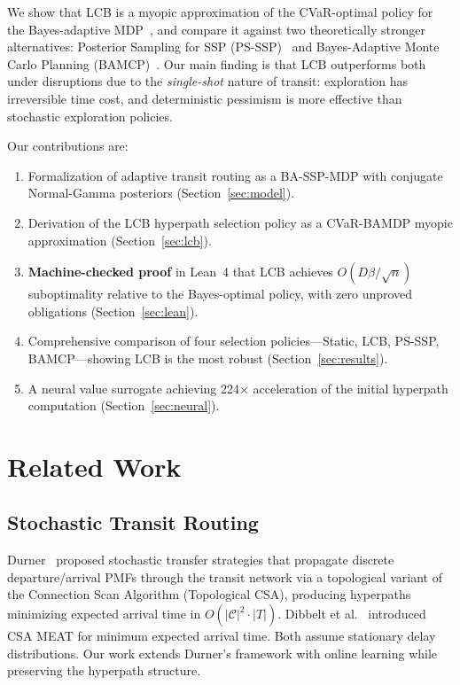 \documentclass[journal]{IEEEtran}
\begin{document}
We show that LCB is a myopic approximation of the CVaR-optimal policy for the Bayes-adaptive MDP~\cite{rigter2021}, and compare it against two theoretically stronger alternatives: Posterior Sampling for SSP (PS-SSP)~\cite{osband2017} and Bayes-Adaptive Monte Carlo Planning (BAMCP)~\cite{guez2012}. Our main finding is that LCB outperforms both under disruptions due to the \emph{single-shot} nature of transit: exploration has irreversible time cost, and deterministic pessimism is more effective than stochastic exploration policies.

Our contributions are:
\begin{enumerate}
\item Formalization of adaptive transit routing as a BA-SSP-MDP with conjugate Normal-Gamma posteriors (Section~\ref{sec:model}).
\item Derivation of the LCB hyperpath selection policy as a CVaR-BAMDP myopic approximation (Section~\ref{sec:lcb}).
\item \textbf{Machine-checked proof} in Lean~4 that LCB achieves $O(D\beta/\sqrt{n})$ suboptimality relative to the Bayes-optimal policy, with zero unproved obligations (Section~\ref{sec:lean}).
\item Comprehensive comparison of four selection policies---Static, LCB, PS-SSP, BAMCP---showing LCB is the most robust (Section~\ref{sec:results}).
\item A neural value surrogate achieving 224$\times$ acceleration of the initial hyperpath computation (Section~\ref{sec:neural}).
\end{enumerate}

\section{Related Work}
\label{sec:related}

\subsection{Stochastic Transit Routing}

Durner~\cite{durner2024} proposed stochastic transfer strategies that propagate discrete departure/arrival PMFs through the transit network via a topological variant of the Connection Scan Algorithm (Topological CSA), producing hyperpaths minimizing expected arrival time in $O(|\mathcal{C}|^2 \cdot |T|)$. Dibbelt et al.~\cite{dibbelt2013} introduced CSA MEAT for minimum expected arrival time. Both assume stationary delay distributions. Our work extends Durner's framework with online learning while preserving the hyperpath structure.
\end{document}
